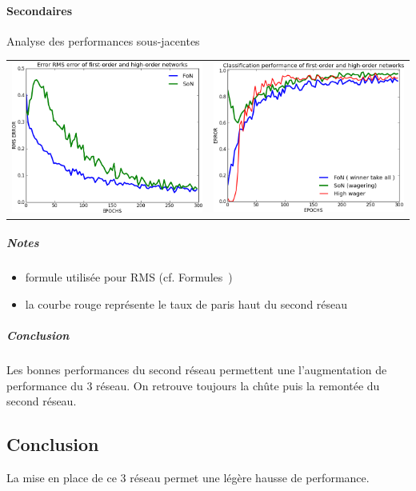     \paragraph{Secondaires}
      Analyse des performances sous-jacentes
      \begin{center}
	\begin{tabular}{lr}
	  \hspace*{-1cm}
	  \includegraphics[width=250px]{data/expF3/rms.png}
	  &
	  \includegraphics[width=250px]{data/expF3/perf.png}
	\end{tabular}
      \end{center} 
      \subparagraph{Notes}
	\begin{itemize}
	  \item formule utilisée pour RMS (cf. Formules~)
	  \item la courbe rouge représente le taux de paris haut du second réseau
	\end{itemize}
      \subparagraph{Conclusion}
	Les bonnes performances du second réseau permettent une l'augmentation de performance du 3 réseau.
	On retrouve toujours la chûte puis la remontée du second réseau.


  \subsection{Conclusion}
  La mise en place de ce 3 réseau permet une légère hausse de performance.
  
